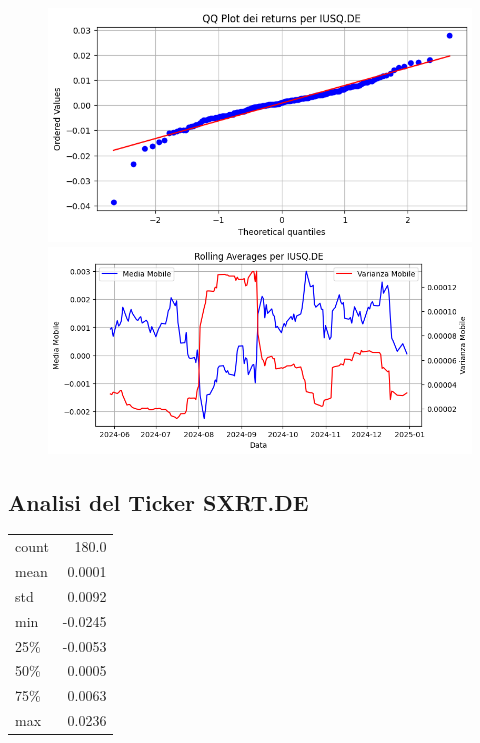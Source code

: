 \documentclass{article}%
\begin{document}
%


\begin{figure}[htbp]%
\begin{minipage}{0.48\textwidth}%
\includegraphics[width=\linewidth]{immagini_tickers/IUSQ.DE_qq_plot.png}%
\end{minipage}%
\begin{minipage}{0.48\textwidth}%
\includegraphics[width=\linewidth]{immagini_tickers/IUSQ.DE_rolling_averages.png}%
\end{minipage}%
\end{figure}

%
\subsection*{Analisi del Ticker SXRT.DE}%
\label{subsec:AnalisidelTickerSXRT.DE}%
\begin{tabular}{lr}%
count&180.0\\%
mean&0.0001\\%
std&0.0092\\%
min&{-}0.0245\\%
25\%&{-}0.0053\\%
50\%&0.0005\\%
75\%&0.0063\\%
max&0.0236\\%
\end{tabular}%
\end{document}
